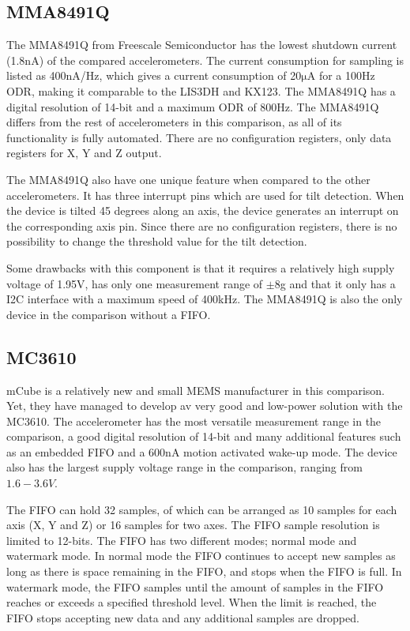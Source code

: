 \subsection{MMA8491Q}

The MMA8491Q from Freescale Semiconductor has the lowest shutdown current (1.8$\si{\nano\ampere}$) of the compared accelerometers. The current consumption for sampling is listed as 400nA/Hz, which gives a current consumption of 20$\si{\micro\ampere}$ for a 100Hz ODR, making it comparable to the LIS3DH and KX123. The MMA8491Q has a digital resolution of 14-bit and a maximum ODR of 800Hz. The MMA8491Q differs from the rest of accelerometers in this comparison, as all of its functionality is fully automated. There are no configuration registers, only data registers for X, Y and Z output. %

The MMA8491Q also have one unique feature when compared to the other accelerometers. It has three interrupt pins which are used for tilt detection. When the device is tilted 45 degrees along an axis, the device generates an interrupt on the corresponding axis pin. Since there are no configuration registers, there is no possibility to change the threshold value for the tilt detection. 

Some drawbacks with this component is that it requires a relatively high supply voltage of 1.95V, has only one measurement range of $\pm$8g and that it only has a I2C interface with a maximum speed of 400kHz. The MMA8491Q is also the only device in the comparison without a FIFO.

\subsection{MC3610}
mCube is a relatively new and small MEMS manufacturer in this comparison. Yet, they have managed to develop av very good and low-power solution with the MC3610. The accelerometer has the most versatile measurement range in the comparison, a good digital resolution of 14-bit and many additional features such as an embedded FIFO and a 600nA motion activated wake-up mode. The device also has the largest supply voltage range in the comparison, ranging from $1.6-3.6V$.

The FIFO can hold 32 samples, of which can be arranged as 10 samples for each axis (X, Y and Z) or 16 samples for two axes. The FIFO sample resolution is limited to 12-bits. The FIFO has two different modes; normal mode and watermark mode. In normal mode the FIFO continues to accept new samples as long as there is space remaining in the FIFO, and stops when the FIFO is full. In watermark mode, the FIFO samples until the amount of samples in the FIFO reaches or exceeds a specified threshold level. When the limit is reached, the FIFO stops accepting new data and any additional samples are dropped.

